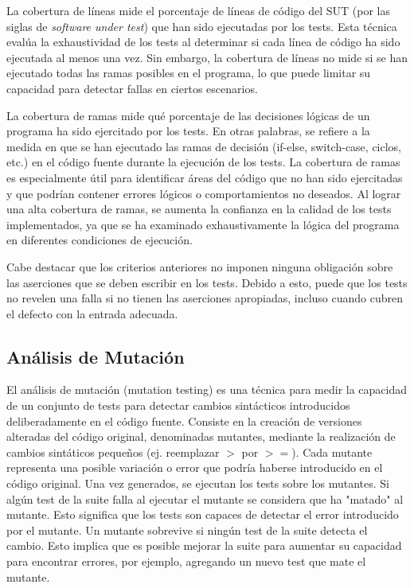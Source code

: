 La cobertura de líneas mide el porcentaje de
líneas de código del SUT (por las siglas de \emph{software under test}) que han sido ejecutadas por los tests. 
Esta técnica evalúa la exhaustividad de los tests al determinar si cada línea de código ha sido ejecutada al menos una vez. 
Sin embargo, la cobertura de líneas no mide si se han ejecutado todas las ramas
posibles en el programa, lo que puede limitar su capacidad para detectar fallas
en ciertos escenarios.

La cobertura de ramas mide qué porcentaje de las
decisiones lógicas de un programa ha sido ejercitado por los tests. En otras
palabras, se refiere a la medida en que se han ejecutado las ramas de decisión
(if-else, switch-case, ciclos, etc.) en el código fuente durante la ejecución de
los tests. La cobertura de ramas es especialmente útil para identificar áreas del 
código que no han sido ejercitadas y que podrían contener errores lógicos o comportamientos no deseados.
Al lograr una alta cobertura de ramas, se aumenta la confianza en la calidad de
los tests implementados, ya que se ha examinado exhaustivamente la lógica del programa 
en diferentes condiciones de ejecución.

Cabe destacar que los criterios anteriores no imponen ninguna obligación sobre
las aserciones que se deben escribir en los tests. Debido a esto, puede que los
tests no revelen una falla si no tienen las aserciones apropiadas, incluso
cuando cubren el defecto con la entrada adecuada.  

\subsection{Análisis de Mutación}

El análisis de mutación (mutation testing) es una técnica para medir la
capacidad de un conjunto de tests para detectar cambios sintácticos
introducidos deliberadamente en el código fuente. Consiste en la creación de versiones 
alteradas del código original, denominadas mutantes, mediante la realización de
cambios sintáticos pequeños (ej. reemplazar $>$ por $>=$). Cada mutante representa una 
posible variación o error que podría haberse introducido en el código original.
Una vez generados, se ejecutan los tests sobre los mutantes. 
Si algún test de la suite falla al ejecutar el mutante se considera que ha
"matado" al mutante. Esto significa que los tests son capaces de detectar el error 
introducido por el mutante. Un mutante sobrevive si ningún test de la suite 
detecta el cambio. Esto implica que es posible mejorar la suite para aumentar su capacidad 
para encontrar errores, por ejemplo, agregando un nuevo test que mate el mutante.

